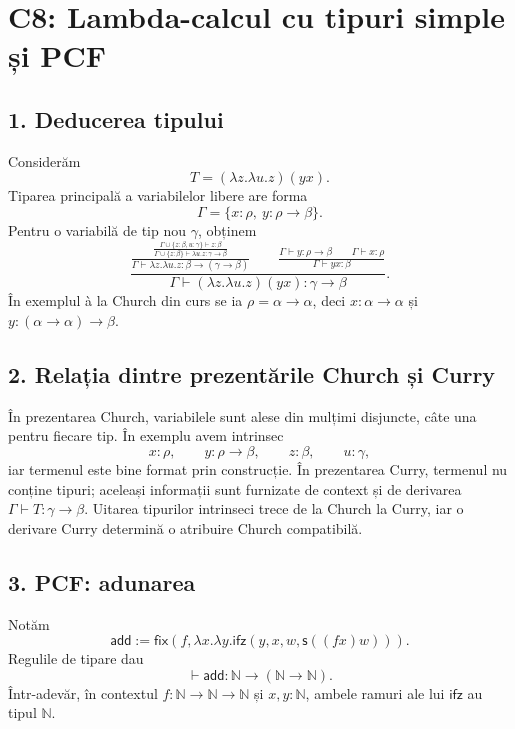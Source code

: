 \section*{C8: Lambda-calcul cu tipuri simple și PCF}

\subsection*{1. Deducerea tipului}

Considerăm
\[
	T=(\lambda z.\lambda u.z)(yx).
\]
Tiparea principală a variabilelor libere are forma
\[
	\Gamma=\{x:\rho,\ y:\rho\to\beta\}.
\]
Pentru o variabilă de tip nou $\gamma$, obținem
\[
\frac{
	\frac{
		\frac{\Gamma\cup\{z:\beta,u:\gamma\}\vdash z:\beta}
		{\Gamma\cup\{z:\beta\}\vdash\lambda u.z:\gamma\to\beta}
	}{
		\Gamma\vdash\lambda z.\lambda u.z:
		\beta\to(\gamma\to\beta)
	}
	\qquad
	\frac{
		\Gamma\vdash y:\rho\to\beta
		\qquad
		\Gamma\vdash x:\rho
	}{
		\Gamma\vdash yx:\beta
	}
}{
	\Gamma\vdash(\lambda z.\lambda u.z)(yx):\gamma\to\beta
}.
\]
În exemplul à la Church din curs se ia
$\rho=\alpha\to\alpha$, deci
$x:\alpha\to\alpha$ și
$y:(\alpha\to\alpha)\to\beta$.

\subsection*{2. Relația dintre prezentările Church și Curry}

În prezentarea Church, variabilele sunt alese din mulțimi disjuncte,
câte una pentru fiecare tip. În exemplu avem intrinsec
\[
	x:\rho,\qquad y:\rho\to\beta,\qquad
	z:\beta,\qquad u:\gamma,
\]
iar termenul este bine format prin construcție. În prezentarea Curry,
termenul nu conține tipuri; aceleași informații sunt furnizate de
context și de derivarea $\Gamma\vdash T:\gamma\to\beta$. Uitarea
tipurilor intrinseci trece de la Church la Curry, iar o derivare Curry
determină o atribuire Church compatibilă.

\subsection*{3. PCF: adunarea}

Notăm
\[
	\mathsf{add}:=
	\mathsf{fix}(f,\lambda x.\lambda y.
	\mathsf{ifz}(y,x,w,\mathsf{s}((fx)w))).
\]
Regulile de tipare dau
\[
	\vdash\mathsf{add}:\mathbb N\to(\mathbb N\to\mathbb N).
\]
Într-adevăr, în contextul
$f:\mathbb N\to\mathbb N\to\mathbb N$ și $x,y:\mathbb N$, ambele ramuri
ale lui $\mathsf{ifz}$ au tipul $\mathbb N$.

